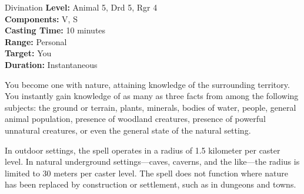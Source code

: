 {Divination}
{
	\textbf{Level:}
	Animal 5, Drd 5, Rgr 4\\
	\textbf{Components:}
	V, S\\
	\textbf{Casting Time:}
	10 minutes\\
	\textbf{Range:}
	Personal\\
	\textbf{Target:}
	You\\
	\textbf{Duration:}
	Instantaneous\\
}
{
	You become one with nature, attaining knowledge of the surrounding territory. You instantly gain knowledge of as many as three facts from among the following subjects: the ground or terrain, plants, minerals, bodies of water, people, general animal population, presence of woodland creatures, presence of powerful unnatural creatures, or even the general state of the natural setting.

	In outdoor settings, the spell operates in a radius of 1.5 kilometer per caster level. In natural underground settings---caves, caverns, and the like---the radius is limited to 30 meters per caster level. The spell does not function where nature has been replaced by construction or settlement, such as in dungeons and towns.

}
